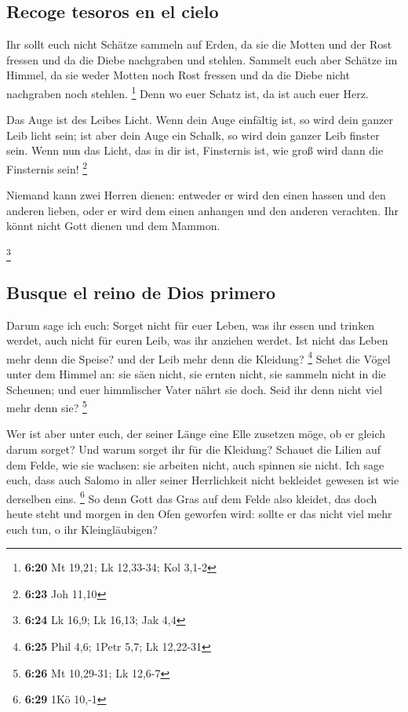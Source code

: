 \hypertarget{recoge-tesoros-en-el-cielo}{%
\subsection{Recoge tesoros en el
cielo}\label{recoge-tesoros-en-el-cielo}}

 Ihr sollt euch nicht Schätze sammeln auf Erden, da sie
die Motten und der Rost fressen und da die Diebe nachgraben und stehlen.
 Sammelt euch aber Schätze im Himmel, da sie weder Motten
noch Rost fressen und da die Diebe nicht nachgraben noch stehlen.
\footnote{\textbf{6:20} Mt 19,21; Lk 12,33-34; Kol 3,1-2}
 Denn wo euer Schatz ist, da ist auch euer Herz.

 Das Auge ist des Leibes Licht. Wenn dein Auge einfältig
ist, so wird dein ganzer Leib licht sein;  ist aber dein
Auge ein Schalk, so wird dein ganzer Leib finster sein. Wenn nun das
Licht, das in dir ist, Finsternis ist, wie groß wird dann die Finsternis
sein! \footnote{\textbf{6:23} Joh 11,10}

 Niemand kann zwei Herren dienen: entweder er wird den
einen hassen und den anderen lieben, oder er wird dem einen anhangen und
den anderen verachten. Ihr könnt nicht Gott dienen und dem Mammon.

\footnote{\textbf{6:24} Lk 16,9; Lk 16,13; Jak 4,4}

\hypertarget{busque-el-reino-de-dios-primero}{%
\subsection{Busque el reino de Dios
primero}\label{busque-el-reino-de-dios-primero}}

 Darum sage ich euch: Sorget nicht für euer Leben, was
ihr essen und trinken werdet, auch nicht für euren Leib, was ihr
anziehen werdet. Ist nicht das Leben mehr denn die Speise? und der Leib
mehr denn die Kleidung? \footnote{\textbf{6:25} Phil 4,6; 1Petr 5,7; Lk
  12,22-31}  Sehet die Vögel unter dem Himmel an: sie
säen nicht, sie ernten nicht, sie sammeln nicht in die Scheunen; und
euer himmlischer Vater nährt sie doch. Seid ihr denn nicht viel mehr
denn sie? \footnote{\textbf{6:26} Mt 10,29-31; Lk 12,6-7}

 Wer ist aber unter euch, der seiner Länge eine Elle
zusetzen möge, ob er gleich darum sorget?  Und warum
sorget ihr für die Kleidung? Schauet die Lilien auf dem Felde, wie sie
wachsen: sie arbeiten nicht, auch spinnen sie nicht.  Ich
sage euch, dass auch Salomo in aller seiner Herrlichkeit nicht bekleidet
gewesen ist wie derselben eins. \footnote{\textbf{6:29} 1Kö 10,-1}
 So denn Gott das Gras auf dem Felde also kleidet, das
doch heute steht und morgen in den Ofen geworfen wird: sollte er das
nicht viel mehr euch tun, o ihr Kleingläubigen?

